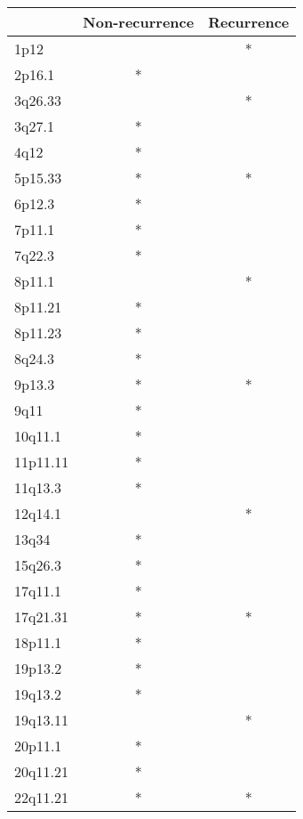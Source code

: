 \begin{tabular}{lcc}
\toprule
{} & Non-recurrence & Recurrence \\
\midrule
1p12     &                &          * \\
2p16.1   &              * &            \\
3q26.33  &                &          * \\
3q27.1   &              * &            \\
4q12     &              * &            \\
5p15.33  &              * &          * \\
6p12.3   &              * &            \\
7p11.1   &              * &            \\
7q22.3   &              * &            \\
8p11.1   &                &          * \\
8p11.21  &              * &            \\
8p11.23  &              * &            \\
8q24.3   &              * &            \\
9p13.3   &              * &          * \\
9q11     &              * &            \\
10q11.1  &              * &            \\
11p11.11 &              * &            \\
11q13.3  &              * &            \\
12q14.1  &                &          * \\
13q34    &              * &            \\
15q26.3  &              * &            \\
17q11.1  &              * &            \\
17q21.31 &              * &          * \\
18p11.1  &              * &            \\
19p13.2  &              * &            \\
19q13.2  &              * &            \\
19q13.11 &                &          * \\
20p11.1  &              * &            \\
20q11.21 &              * &            \\
22q11.21 &              * &          * \\
\bottomrule
\end{tabular}
